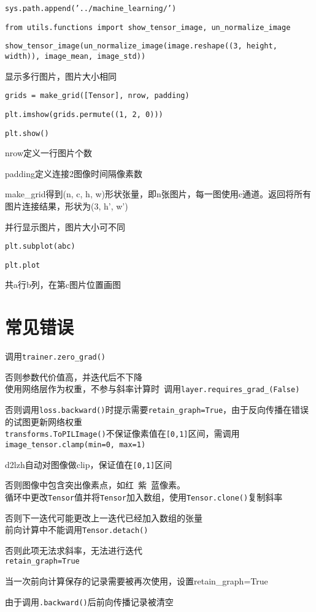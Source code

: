 \documentclass[UTF8]{ctexart}
\begin{document}
  \texttt{sys.path.append('../machine\_learning/')}

  \texttt{from utils.functions import show\_tensor\_image, un\_normalize\_image}

  \texttt{show\_tensor\_image(un\_normalize\_image(image.reshape((3, height, width)), image\_mean, image\_std))}

  显示多行图片，图片大小相同

  \quad \texttt{grids = make\_grid([Tensor], nrow, padding)}

  \quad \texttt{plt.imshow(grids.permute((1, 2, 0)))}

  \quad \texttt{plt.show()}
  
  \quad \quad nrow定义一行图片个数

  \quad \quad padding定义连接2图像时间隔像素数

  \quad \quad make\_grid得到(n, c, h, w)形状张量，即n张图片，每一图使用c通道。返回将所有图片连接结果，形状为(3, h', w')

  并行显示图片，图片大小可不同

  \quad \texttt{plt.subplot(abc)}

  \quad \texttt{plt.plot}

  \quad \quad 共a行b列，在第c图片位置画图


\section{常见错误}
\noindent 调用\texttt{trainer.zero\_grad()}

  否则参数代价值高，并迭代后不下降\\
使用网络层作为权重，不参与斜率计算时\ 调用\texttt{layer.requires\_grad\_(False)}

  否则调用\texttt{loss.backward()}时提示需要\texttt{retain\_graph=True}，由于反向传播在错误的试图更新网络权重\\
\texttt{transforms.ToPILImage()}不保证像素值在\texttt{[0,1]}区间，需调用\texttt{image\_tensor.clamp(min=0, max=1)}

  d2lzh自动对图像做clip，保证值在\texttt{[0,1]}区间
  
  否则图像中包含突出像素点，如红\ 紫\ 蓝像素。\\
循环中更改\texttt{Tensor}值并将\texttt{Tensor}加入数组，使用\texttt{Tensor.clone()}复制斜率

  否则下一迭代可能更改上一迭代已经加入数组的张量\\
前向计算中不能调用\texttt{Tensor.detach()}

  否则此项无法求斜率，无法进行迭代\\
\texttt{retain\_graph=True}

  当一次前向计算保存的记录需要被再次使用，设置retain\_graph=True 

  由于调用\texttt{.backward()}后前向传播记录被清空
\end{document}
